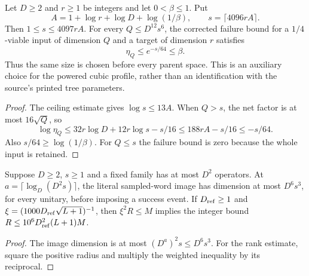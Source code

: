 \begin{lemma}
    \label{thm:viable_node_uniform_sampling_size}
    \leanok
    Let $D\ge2$ and $r\ge1$ be integers and let $0<\beta\le1$. Put
    \[
        A=1+\log r+\log D+\log(1/\beta),\qquad
        s=\lceil4096rA\rceil.
    \]
    Then $1\le s\le4097rA$. For every $Q\le D^{12}s^6$, the
    corrected failure bound for a $1/4$-viable input of dimension $Q$
    and a target of dimension $r$ satisfies
    \[
        \eta_Q\le e^{-s/64}\le\beta.
    \]
    Thus the same size is chosen before every parent space.
    This is an auxiliary choice for the powered cubic profile, rather
    than an identification with the source's printed tree parameters.
\end{lemma}
\begin{proof}\leanok
    The ceiling estimate gives $\log s\le13A$.
    When $Q>s$, the net factor is at most $16\sqrt Q$, so
    \[
        \log\eta_Q
        \le32r\log D+12r\log s-s/16
        \le188rA-s/16\le-s/64.
    \]
    Also $s/64\ge\log(1/\beta)$. For $Q\le s$ the failure bound is
    zero because the whole input is retained.
\end{proof}


\begin{lemma}
    \label{lem:sampled_node_count_rank}
    \leanok
    Suppose $D\ge2$, $s\ge1$ and a fixed family has at most $D^2$
    operators. At $a=\lceil\log_D(D^2s)\rceil$, the literal sampled-word
    image has dimension at most $D^6s^3$, for every unitary, before imposing
    a success event. If $D_{\rm ref}\ge1$ and
    $\xi=(1000D_{\rm ref}\sqrt{L+1})^{-1}$, then
    $\xi^2R\le M$ implies the integer bound
    $R\le10^6D_{\rm ref}^2(L+1)M$.
\end{lemma}
\begin{proof}\leanok
    The image dimension is at most $(D^a)^2s\le D^6s^3$.
    For the rank estimate, square the positive radius and multiply the
    weighted inequality by its reciprocal.
\end{proof}


